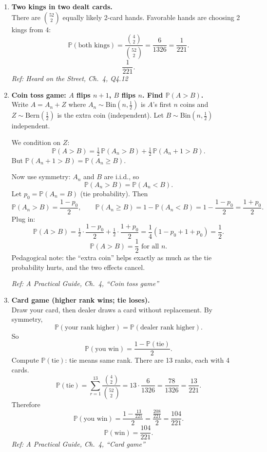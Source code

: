 \documentclass[11pt]{article}
\begin{document}
\begin{enumerate}[label=\textbf{\arabic*.}]
\item \textbf{Two kings in two dealt cards.}\\
There are $\binom{52}{2}$ equally likely 2-card hands. Favorable hands are choosing 2 kings from 4:
\[
\mathbb{P}(\text{both kings})=\frac{\binom{4}{2}}{\binom{52}{2}}
=\frac{6}{1326}=\frac{1}{221}.
\]
\[
\boxed{\frac{1}{221}.}
\]
\hfill{\small\textit{Ref: Heard on the Street, Ch.\ 4, Q4.12}}

\item \textbf{Coin toss game: $A$ flips $n{+}1$, $B$ flips $n$. Find $\mathbb{P}(A>B)$.}\\
Write $A=A_n+Z$ where $A_n\sim\text{Bin}(n,\tfrac12)$ is $A$'s first $n$ coins and $Z\sim\text{Bern}(\tfrac12)$ is the extra coin (independent).
Let $B\sim\text{Bin}(n,\tfrac12)$ independent.

We condition on $Z$:
\[
\mathbb{P}(A>B)=\tfrac12\,\mathbb{P}(A_n>B)+\tfrac12\,\mathbb{P}(A_n+1>B).
\]
But $\mathbb{P}(A_n+1>B)=\mathbb{P}(A_n\ge B)$.

Now use symmetry: $A_n$ and $B$ are i.i.d., so
\[
\mathbb{P}(A_n>B)=\mathbb{P}(A_n<B).
\]
Let $p_0=\mathbb{P}(A_n=B)$ (tie probability). Then
\[
\mathbb{P}(A_n>B)=\frac{1-p_0}{2},
\qquad
\mathbb{P}(A_n\ge B)=1-\mathbb{P}(A_n<B)=1-\frac{1-p_0}{2}=\frac{1+p_0}{2}.
\]
Plug in:
\[
\mathbb{P}(A>B)=\tfrac12\cdot\frac{1-p_0}{2}+\tfrac12\cdot\frac{1+p_0}{2}
=\frac{1}{4}(1-p_0+1+p_0)=\frac12.
\]
\[
\boxed{\mathbb{P}(A>B)=\frac12 \text{ for all } n.}
\]
Pedagogical note: the ``extra coin'' helps exactly as much as the tie probability hurts, and the two effects cancel.

\hfill{\small\textit{Ref: A Practical Guide, Ch.\ 4, ``Coin toss game''}}

\item \textbf{Card game (higher rank wins; tie loses).}\\
Draw your card, then dealer draws a card without replacement. By symmetry,
\[
\mathbb{P}(\text{your rank higher})=\mathbb{P}(\text{dealer rank higher}).
\]
So
\[
\mathbb{P}(\text{you win})=\frac{1-\mathbb{P}(\text{tie})}{2}.
\]
Compute $\mathbb{P}(\text{tie})$: tie means same rank. There are 13 ranks, each with 4 cards.
\[
\mathbb{P}(\text{tie})=\sum_{r=1}^{13}\frac{\binom{4}{2}}{\binom{52}{2}}
=13\cdot \frac{6}{1326}=\frac{78}{1326}=\frac{13}{221}.
\]
Therefore
\[
\mathbb{P}(\text{you win})=\frac{1-\frac{13}{221}}{2}
=\frac{\frac{208}{221}}{2}=\frac{104}{221}.
\]
\[
\boxed{\mathbb{P}(\text{win})=\frac{104}{221}.}
\]
\hfill{\small\textit{Ref: A Practical Guide, Ch.\ 4, ``Card game''}}


\end{enumerate}
\end{document}
